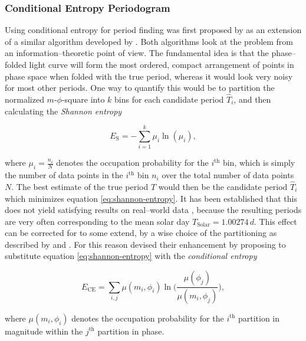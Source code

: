 \subsubsection{Conditional Entropy Periodogram}
\label{subsubsec:conditional-entropy}

Using conditional entropy for period finding was first proposed by \citet{graham2013} as an extension of a similar algorithm developed by \citet{cincotta1995}. Both algorithms look at the problem from an information--theoretic point of view. The fundamental idea is that the phase--folded light curve will form the most ordered, compact arrangement of points in phase space when folded with the true period, whereas it would look very noisy for most other periods. One way to quantify this would be to partition the normalized $m$-$\phi$-square into $k$ bins for each candidate period $\hat T_i$, and then calculating the \emph{Shannon entropy}

\begin{equation}
\label{eq:shannon-entropy}
E_\text{S} = - \sum_{i=1}^k \mu_i \ln(\mu_i),
\end{equation}

where $\mu_i = \frac{n_i}{N}$ denotes the occupation probability for the $i^\text{th}$ bin, which is simply the number of data points in the $i^\text{th}$ bin $n_i$ over the total number of data points $N$. The best estimate of the true period $T$ would then be the candidate period $\hat T_i$ which minimizes equation \eqref{eq:shannon-entropy}. It has been established that this does not yield satisfying results on real--world data \citep{cincotta1999}, because the resulting periods are very often corresponding to the mean solar day $T_{\text{Solar}} = 1.00274 \, \unit{d}$. This effect can be corrected for to some extend, \eg by a wise choice of the partitioning as described by \citet{cincotta1999} and \citet{drake2013}. For this reason \citeauthor{graham2013} devised their enhancement by proposing to substitute equation \eqref{eq:shannon-entropy} with the \emph{conditional entropy}

\begin{equation}
E_\text{CE} = \sum_{i,j} \mu(m_i, \phi_i) \ln\big(\frac{\mu(\phi_j)}{\mu(m_i, \phi_j)}\big),
\end{equation}

where $\mu(m_i, \phi_i)$ denotes the occupation probability for the $i^\text{th}$ partition in magnitude within the $j^\text{th}$ partition in phase.\\


